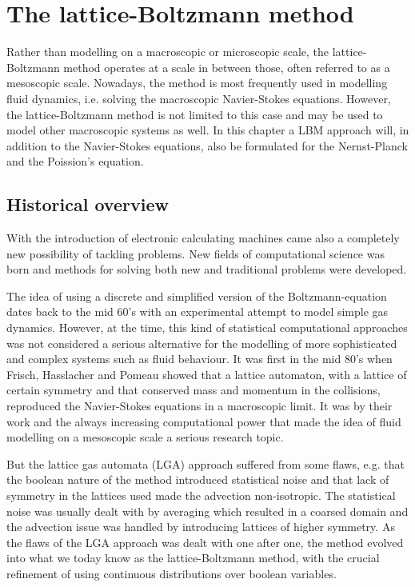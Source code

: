 \chapter{The lattice-Boltzmann method}
Rather than modelling on a macroscopic or microscopic scale, the
lattice-Boltzmann method operates at a scale in between those, often
referred to as a mesoscopic scale. Nowadays, the method is most
frequently used in modelling fluid dynamics, i.e. solving the
macroscopic Navier-Stokes equations. However, the lattice-Boltzmann
method is not limited to this case and may be used to model other
macroscopic systems as well. In this chapter a LBM approach will, in
addition to the Navier-Stokes equations, also be formulated for the
Nernst-Planck and the Poission's equation.

\section{Historical overview}
With the introduction of electronic calculating machines came also a
completely new possibility of tackling problems. New fields of
computational science was born and methods for solving both new and
traditional problems were developed.

The idea of using a discrete and simplified version of the
Boltzmann-equation dates back to the mid 60's \cite{scholarpedia-lbm}
with an experimental attempt to model simple gas dynamics. However, at
the time, this kind of statistical computational approaches was not
considered a serious alternative for the modelling of more
sophisticated and complex systems such as fluid behaviour. It was
first in the mid 80's when Frisch, Hasslacher and Pomeau showed that a
lattice automaton, with a lattice of certain symmetry and that
conserved mass and momentum in the collisions, reproduced the
Navier-Stokes equations in a macroscopic limit. It was by their work
and the always increasing computational power that made the idea of
fluid modelling on a mesoscopic scale a serious research
topic. \cite{wolf-gladrow}

But the lattice gas automata (LGA) approach suffered from some flaws,
e.g. that the boolean nature of the method introduced statistical
noise and that lack of symmetry in the lattices used made the advection
non-isotropic. The statistical noise was usually dealt with by
averaging which resulted in a coarsed domain and the advection issue
was handled by introducing lattices of higher symmetry. As the flaws
of the LGA approach was dealt with one after one, the method evolved
into what we today know as the lattice-Boltzmann method, with the
crucial refinement of using continuous distributions over boolean
variables. \cite{wolf-gladrow} 

